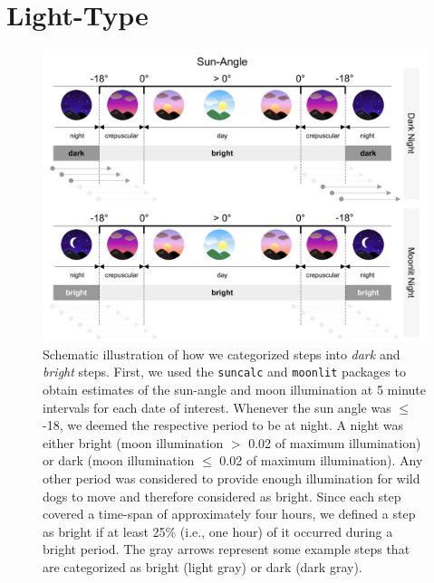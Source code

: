 \documentclass[abstract=on,10pt,a4paper,bibliography=totocnumbered]{article}
\begin{document}
\newpage
\section{Light-Type}

\begin{figure}[htbp]
 \begin{center}
  \includegraphics[width = \textwidth]{Figures/Light.pdf}
  \caption{Schematic illustration of how we categorized steps into \textit{dark}
  and \textit{bright} steps. First, we used the \texttt{suncalc} and
  \texttt{moonlit} packages to obtain estimates of the sun-angle and moon
  illumination at 5 minute intervals for each date of interest. Whenever the sun
  angle was $\leq $ -18\degree, we deemed the respective period to be at night.
  A night was either bright (moon illumination $>$ 0.02 of maximum illumination)
  or dark (moon illumination $\leq$ 0.02 of maximum illumination). Any other
  period was considered to provide enough illumination for wild dogs to move and
  therefore considered as bright. Since each step covered a time-span of
  approximately four hours, we defined a step as bright if at least 25\% (i.e.,
  one hour) of it occurred during a bright period. The gray arrows represent
  some example steps that are categorized as bright (light gray) or dark (dark
  gray).}
  \label{Light}
 \end{center}
\end{figure}
\end{document}
